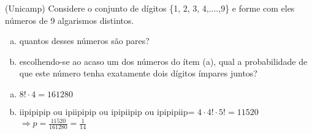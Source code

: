 \begin{ex}
 (Unicamp) Considere o conjunto de dígitos \{1, 2, 3, 4,....,9\} e forme com eles números de 9 algarismos distintos.
    \begin{enumerate}[(a)]
    \item quantos desses números são pares?
    \item escolhendo-se ao acaso um dos números do ítem (a), qual a probabilidade de que este número tenha exatamente dois dígitos ímpares juntos?
    \end{enumerate}
      \begin{sol}
      \phantom{A}
        \begin{enumerate} [(a)]
            \item $8!\cdot4=161280$
            \item iipipipip ou ipiipipip ou ipipiipip ou ipipipiip= $4\cdot4!\cdot5!=11520$\\
            $\Longrightarrow p=\frac{11520}{161280}=\frac{1}{14}$
        \end{enumerate}
      \end{sol}
\end{ex}